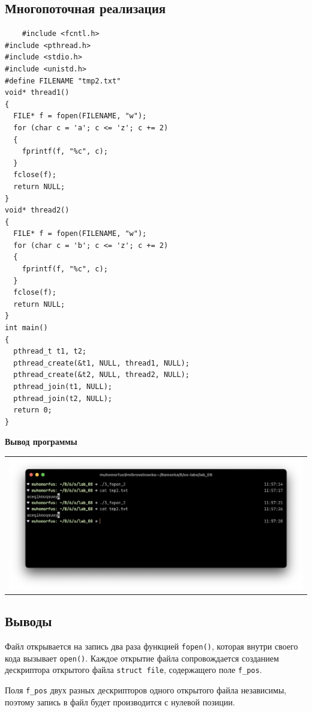 \subsection{Многопоточная реализация}

\begin{lstlisting}
	#include <fcntl.h>
#include <pthread.h>
#include <stdio.h>
#include <unistd.h>
#define FILENAME "tmp2.txt"
void* thread1()
{
  FILE* f = fopen(FILENAME, "w");
  for (char c = 'a'; c <= 'z'; c += 2)
  {
    fprintf(f, "%c", c);
  }
  fclose(f);
  return NULL;
}
void* thread2() 
{
  FILE* f = fopen(FILENAME, "w");
  for (char c = 'b'; c <= 'z'; c += 2)
  { 
    fprintf(f, "%c", c);
  }
  fclose(f);
  return NULL;
}
int main()
{
  pthread_t t1, t2;
  pthread_create(&t1, NULL, thread1, NULL);
  pthread_create(&t2, NULL, thread2, NULL);
  pthread_join(t1, NULL);
  pthread_join(t2, NULL);
  return 0;
}
\end{lstlisting}

\textbf{Вывод программы}

 \begin{table}[H]
	\centering
	\begin{tabular}{p{1\linewidth}}
		\centering
		\includegraphics[width=0.9\linewidth]{./images/6.png}
	\end{tabular}
\end{table}

\subsection{Выводы}

 Файл открывается на запись два раза функцией \texttt{fopen()}, которая внутри своего кода вызывает \texttt{open()}. Каждое открытие файла сопровождается созданием дескриптора открытого файла \texttt{struct file}, содержащего поле \texttt{f\_pos}.
 
  Поля \texttt{f\_pos} двух разных дескрипторов одного открытого файла независимы, поэтому запись в файл будет производится с нулевой позиции.

